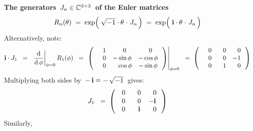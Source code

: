 \noindent
\textbf{The generators \,$J_{n} \in \mathbb{C}^{3 \times 3}$\, of the Euler matrices}
\begin{equation*}
R_{n}(\theta)
\; = \;
	\exp\!\left(\;\sqrt{-1}\cdot\theta \overset{{\color{white}1}}{\cdot} J_{n}\,\right)
\; = \;
	\exp\!\left(\;\i\cdot\theta \overset{{\color{white}1}}{\cdot} J_{n}\,\right)
\end{equation*}
Alternatively, note:
\begin{equation*}
\i \cdot J_{1}
\;\; = \;\;
	\left.\dfrac{\d}{\d\,\phi}\right\vert_{\phi = 0} R_{1}(\phi)
\;\; = \;
	\left.\left(\,
		\begin{array}{ccc}
			{\color{white}-}1 & {\color{white}-}0 & {\color{white}-}0 \\
			{\color{white}-}0 & {\color{black}-}\sin\phi & {\color{black}-}\cos\phi \\
			{\color{white}-}0 & {\color{white}-}\cos\phi & {\color{black}-}\sin\phi \\
			\end{array}
		\,\right)\right\vert_{\phi = 0}
\;\; = \;
	\left(\,
		\begin{array}{ccc}
			{\color{white}-}0 & {\color{white}-}0 & {\color{white}-}0 \\
			{\color{white}-}0 & {\color{white}-}0 & {\color{black}-}1 \\
			{\color{white}-}0 & {\color{white}-}1 & {\color{white}-}0 \\
			\end{array}
		\,\right)
\end{equation*}
Multiplying both sides by \,$-\,\textnormal{\bf i} = -\,\sqrt{-1}$\, gives:
\begin{equation*}
J_{1}
\;\; = \;
	\left(\!\!
		\begin{array}{ccc}
			{\color{white}-}0 & {\color{white}-}0 & {\color{white}-}0 \\
			{\color{white}-}0 & {\color{white}-}0 & {\color{black}-}\i \\
			{\color{white}-}0 & {\color{white}-}\i & {\color{white}-}0 \\
			\end{array}
		\,\right)
\end{equation*}
Similarly,
